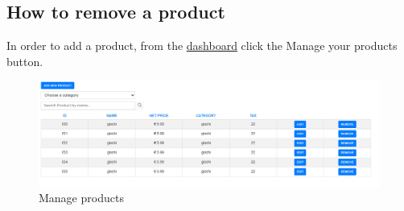 \subsection{How to remove a product}\label{_removeProduct}
In order to add a product, from the \hyperref[_dashboard]{dashboard} click the Manage your products button.
\begin{figure}[H]
    \centering
    \includegraphics[width=\linewidth]{res/images/venditore/productmanagement.png}
    \caption{Manage products}
\end{figure}

